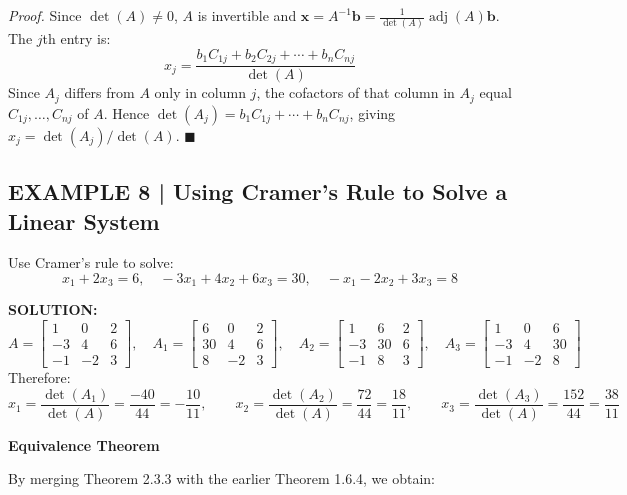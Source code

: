\documentclass{article}
\newcommand{\redheading}[1]{{\vspace{2mm}\noindent\Large\bfseries\color{red!55!black} #1\par}\vspace{2mm}}
\theoremstyle{mystyle}
\begin{document}
\textit{Proof.} Since $\det(A)\neq 0$, $A$ is invertible and
$\mathbf{x}=A^{-1}\mathbf{b}=\frac{1}{\det(A)}\operatorname{adj}(A)\mathbf{b}$.
The $j$th entry is:
\begin{equation}
x_j=\frac{b_1 C_{1j}+b_2 C_{2j}+\cdots+b_n C_{nj}}{\det(A)} \tag{9}
\end{equation}
Since $A_j$ differs from $A$ only in column $j$, the cofactors of that column in $A_j$
equal $C_{1j},\ldots,C_{nj}$ of $A$. Hence $\det(A_j)=b_1 C_{1j}+\cdots+b_n C_{nj}$,
giving $x_j=\det(A_j)/\det(A)$. $\blacksquare$

\subsection*{EXAMPLE 8 | Using Cramer's Rule to Solve a Linear System}

Use Cramer's rule to solve:
\[
x_1+2x_3=6,\quad -3x_1+4x_2+6x_3=30,\quad -x_1-2x_2+3x_3=8
\]

\textbf{SOLUTION:}
\[
A=\begin{bmatrix}1&0&2\\-3&4&6\\-1&-2&3\end{bmatrix},\quad
A_1=\begin{bmatrix}6&0&2\\30&4&6\\8&-2&3\end{bmatrix},\quad
A_2=\begin{bmatrix}1&6&2\\-3&30&6\\-1&8&3\end{bmatrix},\quad
A_3=\begin{bmatrix}1&0&6\\-3&4&30\\-1&-2&8\end{bmatrix}
\]
Therefore:
\[
x_1=\frac{\det(A_1)}{\det(A)}=\frac{-40}{44}=-\frac{10}{11},\qquad
x_2=\frac{\det(A_2)}{\det(A)}=\frac{72}{44}=\frac{18}{11},\qquad
x_3=\frac{\det(A_3)}{\det(A)}=\frac{152}{44}=\frac{38}{11}
\]

\redheading{Equivalence Theorem}

By merging Theorem 2.3.3 with the earlier Theorem 1.6.4, we obtain:
\end{document}

